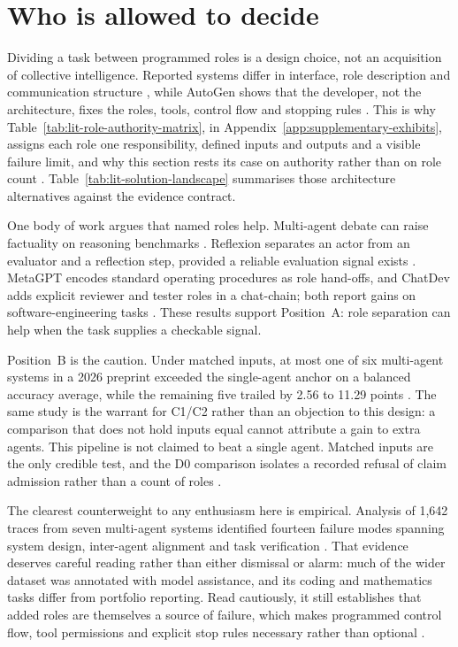 \section{Who is allowed to decide}
\label{sec:design-alternatives}

Dividing a task between programmed roles is a design choice, not an acquisition of collective
intelligence. Reported systems differ in interface, role description and communication structure
\citep{guo2024multiagent}, while AutoGen shows that the developer, not the architecture, fixes
the roles, tools, control flow and stopping rules \citep{wu2024autogen}. This is why
Table~\ref{tab:lit-role-authority-matrix}, in Appendix~\ref{app:supplementary-exhibits}, assigns
each role one responsibility, defined inputs and outputs and a visible failure limit, and why
this section rests its case on authority rather than on role count
\citep{peffers2007dsrm,hevner2004design}.
Table~\ref{tab:lit-solution-landscape} summarises those architecture alternatives against the
evidence contract.



One body of work argues that named roles help. Multi-agent debate can raise factuality on
reasoning benchmarks \citep{du2024debate,guo2024multiagent}. Reflexion separates an actor from an
evaluator and a reflection step, provided a reliable evaluation signal exists
\citep{shinn2023reflexion,wu2024autogen}. MetaGPT encodes standard operating procedures as role
hand-offs, and ChatDev adds explicit reviewer and tester roles in a chat-chain; both report gains
on software-engineering tasks \citep{hong2023metagpt,qian2024chatdev}. These results support
Position~A: role separation can help when the task supplies a checkable signal.

Position~B is the caution. Under matched inputs, at most one of six multi-agent systems in a 2026
preprint exceeded the single-agent anchor on a balanced accuracy average, while the remaining
five trailed by 2.56 to 11.29 points \citep{fu2026agents,cemri2025masfailures}. The same study is
the warrant for C1/C2 rather than an objection to this design: a comparison that does not hold
inputs equal cannot attribute a gain to extra agents. This pipeline is not claimed to beat a
single agent. Matched inputs are the only credible test, and the D0 comparison isolates a
recorded refusal of claim admission rather than a count of roles
\citep{fu2026agents,peffers2007dsrm}.

The clearest counterweight to any enthusiasm here is empirical. Analysis of 1,642 traces from
seven multi-agent systems identified fourteen failure modes spanning system design, inter-agent
alignment and task verification \citep{cemri2025masfailures}. That evidence deserves careful
reading rather than either dismissal or alarm: much of the wider dataset was annotated with
model assistance, and its coding and mathematics tasks differ from portfolio reporting. Read
cautiously, it still establishes that added roles are themselves a source of failure, which
makes programmed control flow, tool permissions and explicit stop rules necessary rather than
optional \citep{wu2024autogen,nist2023airmf}.

